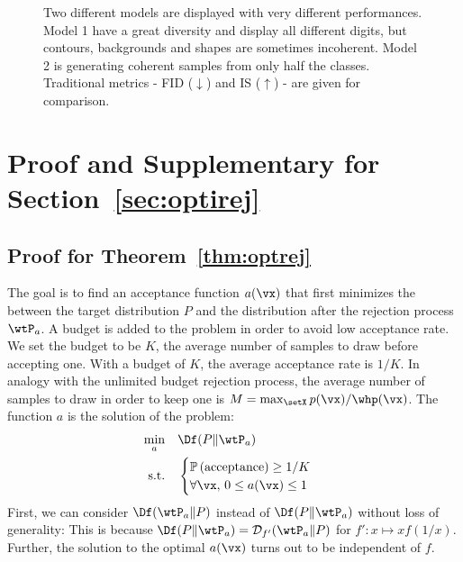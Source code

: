\documentclass[twoside]{article}
\begin{document}
 \begin{figure}[H]
 \centering
    \caption{Two different models are displayed with very different performances. Model 1 have a great diversity and display all different digits, but contours, backgrounds and shapes are sometimes incoherent. Model 2 is generating coherent samples from only half the classes. Traditional metrics - FID ($\downarrow$) and IS ($\uparrow$) - are given for comparison. }
    \label{app:fig:PRMNIST}
\end{figure}
\section{Proof and Supplementary for Section~\ref{sec:optirej}}
\subsection{Proof for Theorem~\ref{thm:optrej}}\label{app:sec:proofoptirej}
The goal is to find an acceptance function $a(\vx)$ that first minimizes the \fdiv between the target distribution $P$ and the distribution after the rejection process $\wtP_a$. A budget is added to the problem in order to avoid low acceptance rate. We set the budget to be $K$, the average number of samples to draw before accepting one. With a budget of $K$, the average acceptance rate is  $1/K$. In analogy with the unlimited budget rejection process, the average number of samples to draw in order to keep one is $M=\max_{\setX} p(\vx)/\whp(\vx)$. The function $a$ is the solution of the problem:
\begin{align}
	\begin{split}
		\min_a & \quad\Df(P\Vert\wtP_a ) \\
		\mbox{s.t.} &\quad \begin{cases} \mathbb{P}\left(\mbox{acceptance}\right)\geq1/K \\
		\forall \vx, \, 0\leq a(\vx) \leq 1 \end{cases}
	\end{split}
\end{align}
First, we can consider $\Df(\wtP_a\Vert P )$ instead of $\Df(P\Vert\wtP_a )$ without loss of generality: This is because  $\Df(P\Vert\wtP_a ) = \mathcal{D}_{f'}(\wtP_a\Vert P )$ for $f': x\mapsto xf(1/x)$. Further, the solution to the optimal $a(\vx)$ turns out to be independent of $f$.
\end{document}
